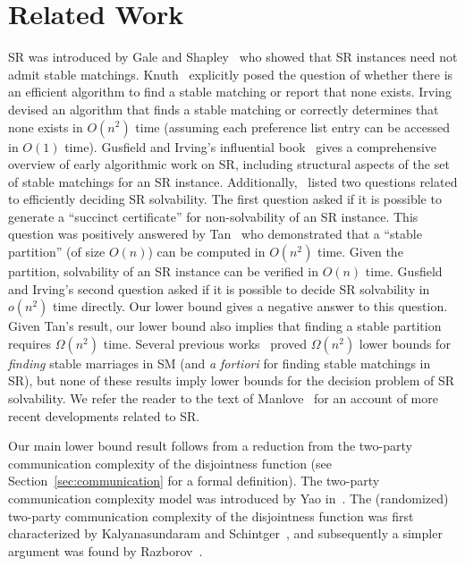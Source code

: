 \section{Related Work}
SR was introduced by Gale and Shapley~\cite{GS62} who showed that SR instances need not admit stable matchings. Knuth~\cite{Knuth76} explicitly posed the question of whether there is an efficient algorithm to find a stable matching or report that none exists. Irving~\cite{Irving1985-stable} devised an algorithm that finds a stable matching or correctly determines that none exists in $O(n^2)$ time (assuming each preference list entry can be accessed in $O(1)$ time). Gusfield and Irving's influential book~\cite{GI89} gives a comprehensive overview of early algorithmic work on SR, including structural aspects of the set of stable matchings for an SR instance. Additionally,~\cite{GI89} listed two questions related to efficiently deciding SR solvability. The first question asked if it is possible to generate a ``succinct certificate'' for non-solvability of an SR instance. This question was positively answered by Tan~\cite{Tan1991-necessary} who demonstrated that a ``stable partition'' (of size $O(n)$) can be computed in $O(n^2)$ time. Given the partition, solvability of an SR instance can be verified in $O(n)$ time. Gusfield and Irving's second question asked if it is possible to decide SR solvability in $o(n^2)$ time directly. Our lower bound gives a negative answer to this question. Given Tan's result, our lower bound also implies that finding a stable partition requires $\Omega(n^2)$ time. Several previous works~\cite{HN90,CL10,Segal03,Gonczarowski2019-stable} proved $\Omega(n^2)$ lower bounds for \emph{finding} stable marriages in SM (and \emph{a fortiori} for finding stable matchings in SR), but none of these results imply lower bounds for the decision problem of SR solvability. We refer the reader to the text of Manlove~\cite{Manlove2013-algorithmics} for an account of more recent developments related to SR.

Our main lower bound result follows from a reduction from the two-party communication complexity of the disjointness function (see Section~\ref{sec:communication} for a formal definition). The two-party communication complexity model was introduced by Yao in~\cite{Yao79}. The (randomized) two-party communication complexity of the disjointness function was first characterized by Kalyanasundaram and Schintger~\cite{KS92}, and subsequently a simpler argument was found by Razborov~\cite{Razborov92}. 

